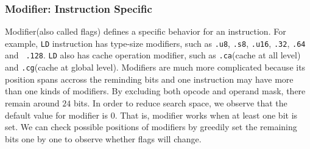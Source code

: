 \subsubsection{Modifier: Instruction Specific}

Modifier(also called flags) defines a specific behavior for an instruction. For example,
{\tt LD} instruction has type-size modifiers, such as {\tt .u8}, {\tt .s8}, {\tt .u16}, {\tt .32}, {\tt .64} and {\tt 
.128}. {\tt LD} also has cache operation modifier, such as {\tt .ca}(cache at all level) and {\tt .cg}(cache at global 
level). Modifiers are much more complicated because its position spans accross the reminding bits and one instruction 
may have more than one kinds of modifiers. By excluding both opcode and operand mask, there remain around $24$ bits. In 
order to reduce search space, we observe that the default value for modifier is $0$. That is, modifier works when at 
least one bit is set. We can check possible positions of modifiers by greedily set the remaining bits one by one to 
observe whether flags will change.
